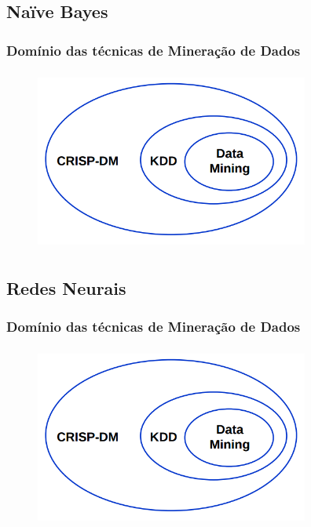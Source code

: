 \documentclass[11pt]{beamer}
\begin{document}
\subsection*{ Naïve Bayes}

\begin{frame}\frametitle{ Domínio das técnicas de Mineração de Dados}
	\transdissolve[duration=2, direction=25]
	\begin{figure}[!ht]
		\includegraphics[width=90mm, height=60mm]{Figuras/BigData/RelacaoCrispKddDm.png}
	\end{figure}
\end{frame}

\subsection*{ Redes Neurais}

\begin{frame}\frametitle{ Domínio das técnicas de Mineração de Dados}
	\transdissolve[duration=2, direction=25]
	\begin{figure}[!ht]
		\includegraphics[width=90mm, height=60mm]{Figuras/BigData/RelacaoCrispKddDm.png}
	\end{figure}
\end{frame}

\end{document}
